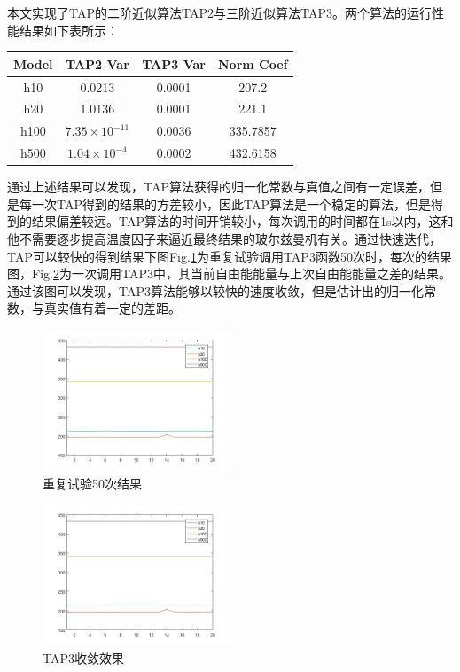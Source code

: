 \documentclass[journal,a4paper]{IEEEtran}
\begin{document}
		本文实现了TAP的二阶近似算法TAP2与三阶近似算法TAP3。两个算法的运行性能结果如下表所示：
		\begin{center}
		\begin{tabular}{c|ccc}
			\hline
			Model & TAP2 Var & TAP3 Var & Norm Coef\\
			\hline
			h10 & 0.0213 & 0.0001 & 207.2 \\
			h20 & 1.0136 & 0.0001 & 221.1 \\
			h100 & $7.35\times 10^{-11}$ & 0.0036 & 335.7857 \\
			h500 & $1.04\times 10^{-4}$ & 0.0002 & 432.6158 \\
			\hline
		\end{tabular}
	\end{center}
		通过上述结果可以发现，TAP算法获得的归一化常数与真值之间有一定误差，但是每一次TAP得到的结果的方差较小，因此TAP算法是一个稳定的算法，但是得到的结果偏差较远。TAP算法的时间开销较小，每次调用的时间都在1s以内，这和他不需要逐步提高温度因子来逼近最终结果的玻尔兹曼机有关。通过快速迭代，TAP可以较快的得到结果下图Fig.\ref{fig4}为重复试验调用TAP3函数50次时，每次的结果图，Fig.\ref{fig5}为一次调用TAP3中，其当前自由能能量与上次自由能能量之差的结果。通过该图可以发现，TAP3算法能够以较快的速度收敛，但是估计出的归一化常数，与真实值有着一定的差距。
		\begin{figure}[h]
			\includegraphics[width=0.5\textwidth]{4.jpg}
			\caption{重复试验50次结果}
			\label{fig4}
		\end{figure}
		\begin{figure}[h]
			\includegraphics[width=0.5\textwidth]{4.jpg}
			\caption{TAP3收敛效果}
			\label{fig5}
		\end{figure}
	
\end{document}
